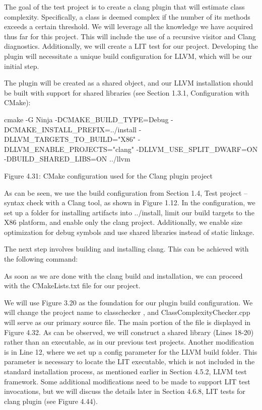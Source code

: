 The goal of the test project is to create a clang plugin that will estimate class complexity. Specifically, a class is deemed complex if the number of its methods exceeds a certain threshold. We will leverage all the knowledge we have acquired thus far for this project. This will include the use of a recursive visitor and Clang diagnostics. Additionally, we will create a LIT test for our project. Developing the plugin will necessitate a unique build configuration for LLVM, which will be our initial step.



The plugin will be created as a shared object, and our LLVM installation should be built with support for shared libraries (see Section 1.3.1, Configuration with CMake):

\begin{shell}
cmake -G Ninja -DCMAKE_BUILD_TYPE=Debug -DCMAKE_INSTALL_PREFIX=../install -DLLVM_TARGETS_TO_BUILD="X86" -DLLVM_ENABLE_PROJECTS="clang" -DLLVM_USE_SPLIT_DWARF=ON -DBUILD_SHARED_LIBS=ON ../llvm
\end{shell}

\begin{center}
Figure 4.31: CMake configuration used for the Clang plugin project
\end{center}

As can be seen, we use the build configuration from Section 1.4, Test project – syntax check with a Clang tool, as shown in Figure 1.12. In the configuration, we set up a folder for installing artifacts into ../install, limit our build targets to the X86 platform, and enable only the clang project. Additionally, we enable size optimization for debug symbols and use shared libraries instead of static linkage.

The next step involves building and installing clang. This can be achieved with the following command:


As soon as we are done with the clang build and installation, we can proceed with the CMakeLists.txt file for our project.


We will use Figure 3.20 as the foundation for our plugin build configuration. We will change the project name to classchecker , and ClassComplexityChecker.cpp will serve as our primary source file. The main portion of the file is displayed in Figure 4.32. As can be observed, we will construct a shared library (Lines 18-20) rather than an executable, as in our previous test projects. Another modification is in Line 12, where we set up a config parameter for the LLVM build folder. This parameter is necessary to locate the LIT executable, which is not included in the standard installation process, as mentioned earlier in Section 4.5.2, LLVM test framework. Some additional modifications need to be made to support LIT test invocations, but we will discuss the details later in Section 4.6.8, LIT tests for clang plugin (see Figure 4.44).

